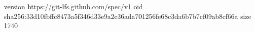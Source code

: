 version https://git-lfs.github.com/spec/v1
oid sha256:33d10fbffc8473a5f346d33e9a2c36ada701256fe68c3da6b7b7cf09ab8cf66a
size 1740
